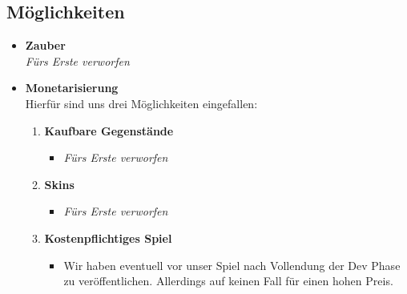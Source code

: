 \subsection*{Möglichkeiten}
\begin{itemize}
    \item \textbf{Zauber} \\
        \textit{Fürs Erste verworfen}
    \item \textbf{Monetarisierung} \\
    Hierfür sind uns drei Möglichkeiten eingefallen:
    \begin{enumerate}
        \item \textbf{Kaufbare Gegenstände}
        \begin{itemize}
            \item \textit{Fürs Erste verworfen}
        \end{itemize}
        \item \textbf{Skins}
        \begin{itemize}
            \item \textit{Fürs Erste verworfen}
        \end{itemize}
        \item \textbf{Kostenpflichtiges Spiel}
        \begin{itemize}
            \item Wir haben eventuell vor unser Spiel nach Vollendung der Dev Phase zu veröffentlichen. Allerdings auf keinen Fall für einen hohen Preis.
        \end{itemize}
        

\end{enumerate}
\end{itemize}
